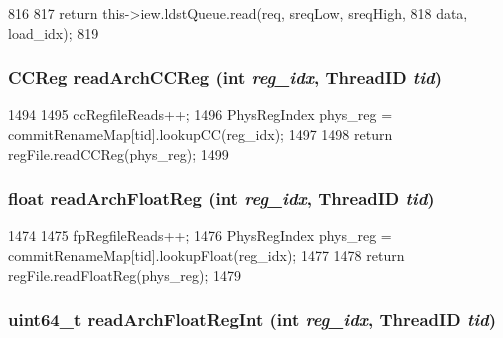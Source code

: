 \begin{DoxyCode}
816     {
817         return this->iew.ldstQueue.read(req, sreqLow, sreqHigh,
818                                         data, load_idx);
819     }
\end{DoxyCode}
\hypertarget{classFullO3CPU_a58ef256fe449eed12535745bd734f4ef}{
\subsubsection[{readArchCCReg}]{\setlength{\rightskip}{0pt plus 5cm}CCReg readArchCCReg (int {\em reg\_\-idx}, \/  {\bf ThreadID} {\em tid})}}
\label{classFullO3CPU_a58ef256fe449eed12535745bd734f4ef}



\begin{DoxyCode}
1494 {
1495     ccRegfileReads++;
1496     PhysRegIndex phys_reg = commitRenameMap[tid].lookupCC(reg_idx);
1497 
1498     return regFile.readCCReg(phys_reg);
1499 }
\end{DoxyCode}
\hypertarget{classFullO3CPU_adaf99a897128e25170e65323b1a5e342}{
\subsubsection[{readArchFloatReg}]{\setlength{\rightskip}{0pt plus 5cm}float readArchFloatReg (int {\em reg\_\-idx}, \/  {\bf ThreadID} {\em tid})}}
\label{classFullO3CPU_adaf99a897128e25170e65323b1a5e342}



\begin{DoxyCode}
1474 {
1475     fpRegfileReads++;
1476     PhysRegIndex phys_reg = commitRenameMap[tid].lookupFloat(reg_idx);
1477 
1478     return regFile.readFloatReg(phys_reg);
1479 }
\end{DoxyCode}
\hypertarget{classFullO3CPU_a60141decbd780846e6669adf59970db1}{
\subsubsection[{readArchFloatRegInt}]{\setlength{\rightskip}{0pt plus 5cm}uint64\_\-t readArchFloatRegInt (int {\em reg\_\-idx}, \/  {\bf ThreadID} {\em tid})}}
\label{classFullO3CPU_a60141decbd780846e6669adf59970db1}




